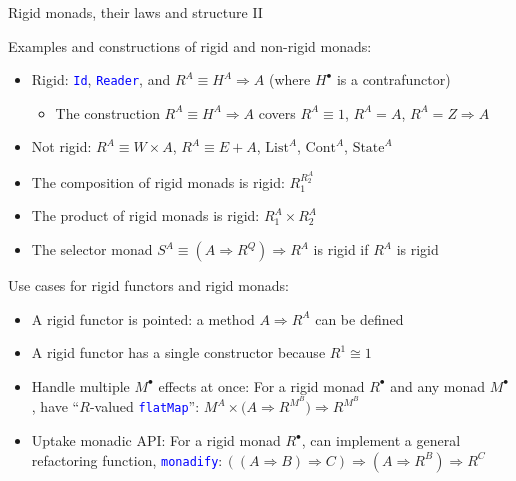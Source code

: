 \documentclass[english]{beamer}
\begin{document}
\begin{frame}{Rigid monads, their laws and structure II}

Examples and constructions of rigid and non-rigid monads:
\begin{itemize}
\item Rigid: \texttt{\textcolor{blue}{\footnotesize{}Id}}, \texttt{\textcolor{blue}{\footnotesize{}Reader}},
and $R^{A}\equiv H^{A}\Rightarrow A$ (where $H^{\bullet}$ is a contrafunctor)
\begin{itemize}
\item The construction $R^{A}\equiv H^{A}\Rightarrow A$ covers $R^{A}\equiv1$,
$R^{A}=A$, $R^{A}=Z\Rightarrow A$
\end{itemize}
\item Not rigid: $R^{A}\equiv W\times A$, $R^{A}\equiv E+A$, $\text{List}^{A}$,
$\text{Cont}^{A}$, $\text{State}^{A}$
\item The composition of rigid monads is rigid: $R_{1}^{R_{2}^{A}}$
\item The product of rigid monads is rigid: $R_{1}^{A}\times R_{2}^{A}$
\item The selector monad $S^{A}\equiv\left(A\Rightarrow R^{Q}\right)\Rightarrow R^{A}$
is rigid if $R^{A}$ is rigid
\end{itemize}
Use cases for rigid functors and rigid monads:
\begin{itemize}
\item A rigid functor is pointed: a method $A\Rightarrow R^{A}$ can be
defined
\item A rigid functor has a single constructor because $R^{1}\cong1$
\item Handle multiple $M^{\bullet}$ effects at once: For a rigid monad
$R^{\bullet}$ and any monad $M^{\bullet}$, have ``$R$-valued \texttt{\textcolor{blue}{\footnotesize{}flatMap}}'':
$M^{A}\times\big(A\Rightarrow R^{M^{B}}\big)\Rightarrow R^{M^{B}}$
\item Uptake monadic API: For a rigid monad $R^{\bullet}$, can implement
a general refactoring function, \texttt{\textcolor{blue}{\footnotesize{}monadify}}$:\left(\left(A\Rightarrow B\right)\Rightarrow C\right)\Rightarrow\left(A\Rightarrow R^{B}\right)\Rightarrow R^{C}$
\end{itemize}
\end{frame}
\end{document}
